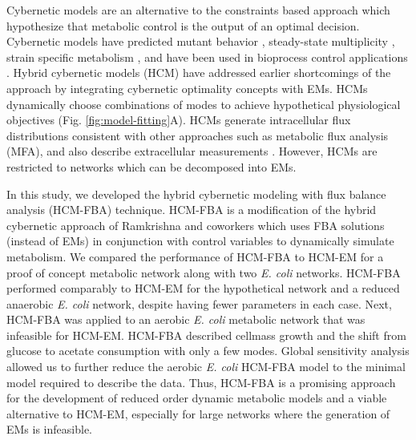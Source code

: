 \documentclass[10pt,twocolumn,twoside,final]{IEEEtran}
\begin{document}
Cybernetic models are an alternative to the constraints based approach which hypothesize that metabolic control is the output of an optimal decision.
Cybernetic models have predicted mutant behavior \cite{1999_varner_ramkrishna_MetaEng,Song:2012aa}, steady-state multiplicity \cite{2012_kim_ramkrishna_BiotechProg}, strain specific metabolism \cite{Song:2011aa}, and have been used in bioprocess control applications \cite{Gadkar:2003aa}.
Hybrid cybernetic models (HCM) have addressed earlier shortcomings of the approach by integrating cybernetic optimality concepts with EMs.
HCMs dynamically choose combinations of modes to achieve hypothetical physiological objectives (Fig. \ref{fig:model-fitting}A).
HCMs generate intracellular flux distributions consistent with other approaches such as metabolic flux analysis (MFA), and also describe extracellular measurements \cite{2008_kim_varner_ramkrishna_BiotechProg}. 
However, HCMs are restricted to networks which can be decomposed into EMs.


In this study, we developed the hybrid cybernetic modeling with flux balance analysis (HCM-FBA) technique.
HCM-FBA is a modification of the hybrid cybernetic approach of Ramkrishna and coworkers \cite{2008_kim_varner_ramkrishna_BiotechProg} which uses FBA solutions
(instead of EMs) in conjunction with control variables to dynamically simulate metabolism.
We compared the performance of HCM-FBA to HCM-EM for a proof of concept metabolic network along with two \emph{E. coli} networks.
HCM-FBA performed comparably to HCM-EM for the hypothetical network and a reduced anaerobic \textit{E. coli} network, despite having fewer parameters in each case.
Next, HCM-FBA was applied to an aerobic \textit{E. coli} metabolic network that was infeasible for HCM-EM.
HCM-FBA described cellmass growth and the shift from glucose to acetate consumption with only a few modes.
Global sensitivity analysis allowed us to further reduce the aerobic \textit{E. coli} HCM-FBA model to the minimal model required to describe the data.
Thus, HCM-FBA is a promising approach for the development of reduced order dynamic metabolic models
and a viable alternative to HCM-EM, especially for large networks where the generation of EMs is infeasible.
\end{document}
